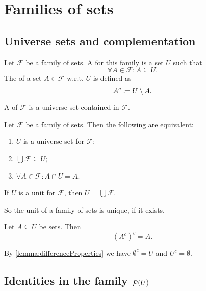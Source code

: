 \section{Families of sets}
\subsection{Universe sets and complementation}
\begin{definition}
Let $\mathcal{F}$ be a family of sets. A  for this family is a set $U$ such that
\[ \forall A\in \mathcal{F}: A \subseteq U. \]
The  of a set $A\in\mathcal{F}$ w.r.t. $U$ is defined as
\[ A^c \coloneqq U\setminus A. \]

A  of $\mathcal{F}$ is a universe set contained in $\mathcal{F}$.
\end{definition}
\begin{lemma}
Let $\mathcal{F}$ be a family of sets. Then the following are equivalent:
\begin{enumerate}
\item $U$ is a universe set for $\mathcal{F}$;
\item $\bigcup\mathcal{F} \subseteq U$;
\item $\forall A\in \mathcal{F}: A\cap U = A$.
\end{enumerate}
If $U$ is a unit for $\mathcal{F}$, then $U=\bigcup\mathcal{F}$.
\end{lemma}
So the unit of a family of sets is unique, if it exists.

\begin{lemma}
Let $A\subseteq U$ be sets. Then
\[ (A^c)^c = A. \]
\end{lemma}

By \ref{lemma:differenceProperties} we have $\emptyset^c = U$ and $U^c = \emptyset$.

\subsection{Identities in the family $\mathop{\mathcal{P}}(U)$}
